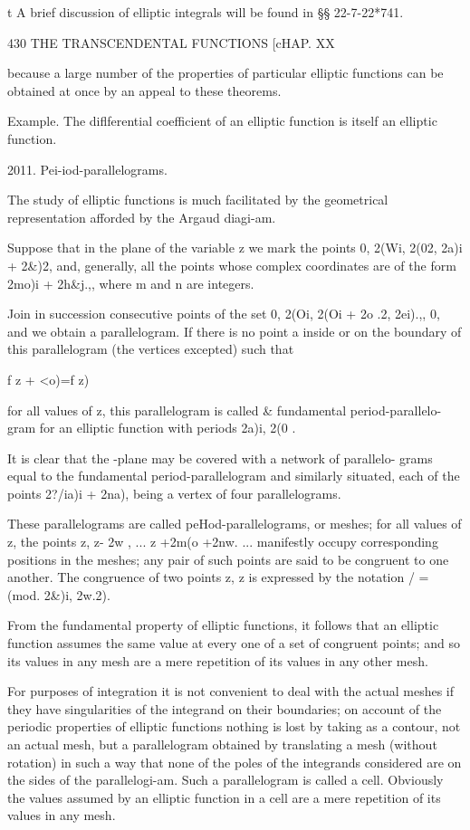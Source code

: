 t A brief discussion of elliptic integrals will be found in §§
22-7-22*741.

430 THE TRANSCENDENTAL FUNCTIONS [cHAP. XX

because a large number of the properties of particular elliptic
functions can be obtained at once by an appeal to these theorems.

Example. The diflferential coefficient of an elliptic function is
itself an elliptic function.

2011. Pei-iod-parallelograms.

The study of elliptic functions is much facilitated by the geometrical
representation afforded by the Argaud diagi-am.

Suppose that in the plane of the variable z we mark the points 0,
2(Wi, 2(02, 2a)i + 2\&)2, and, generally, all the points whose complex
coordinates are of the form 2mo)i + 2h\&j.,, where m and n are
integers.

Join in succession consecutive points of the set 0, 2(Oi, 2(Oi + 2o
.2, 2ei).,, 0, and we obtain a parallelogram. If there is no point a
inside or on the boundary of this parallelogram (the vertices
excepted) such that

f z + <o)=f z)

for all values of z, this parallelogram is called \& fundamental
period-parallelo- gram for an elliptic function with periods 2a)i, 2(0
.

It is clear that the -plane may be covered with a network of
parallelo- grams equal to the fundamental period-parallelogram and
similarly situated, each of the points 2?/ia)i + 2na), being a vertex
of four parallelograms.

These parallelograms are called peHod-parallelograms, or meshes; for
all values of z, the points z, z- 2w , ... z +2m(o +2nw. ...
manifestly occupy corresponding positions in the meshes; any pair of
such points are said to be congruent to one another. The congruence of
two points z, z is expressed by the notation / = (mod. 2\&)i, 2w.2).

From the fundamental property of elliptic functions, it follows that
an elliptic function assumes the same value at every one of a set of
congruent points; and so its values in any mesh are a mere repetition
of its values in any other mesh.

For purposes of integration it is not convenient to deal with the
actual meshes if they have singularities of the integrand on their
boundaries; on account of the periodic properties of elliptic
functions nothing is lost by taking as a contour, not an actual mesh,
but a parallelogram obtained by translating a mesh (without rotation)
in such a way that none of the poles of the integrands considered are
on the sides of the parallelogi-am. Such a parallelogram is called a
cell. Obviously the values assumed by an elliptic function in a cell
are a mere repetition of its values in any mesh.

